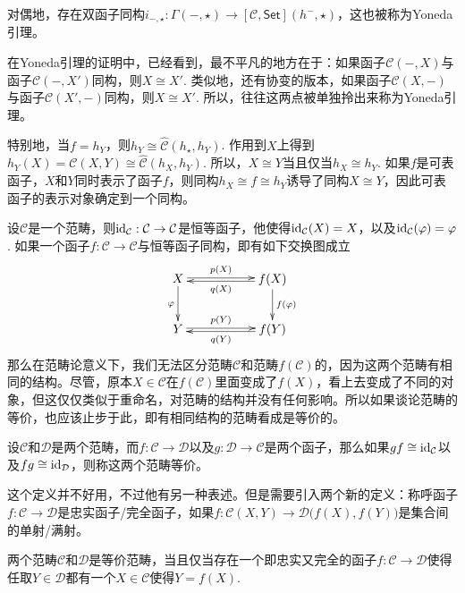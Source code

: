 \begin{pro}
对偶地，存在双函子同构$i_{-,\star}:\Gamma(-,\star)\to [\mathcal{C},\mathsf{Set}](h^-,\star)$，这也被称为Yoneda引理。
\end{pro}

在Yoneda引理的证明中，已经看到，最不平凡的地方在于：如果函子$\mathcal{C}(-,X)$与函子$\mathcal{C}(-,X')$同构，则$X\cong X'$. 类似地，还有协变的版本，如果函子$\mathcal{C}(X,-)$与函子$\mathcal{C}(X',-)$同构，则$X\cong X'$. 所以，往往这两点被单独拎出来称为Yoneda引理。

\para 特别地，当$f=h_Y$，则$h_Y\cong {\hat{\mathcal{C}}}(h_\star,h_Y)$. 作用到$X$上得到$h_Y(X)={\mathcal{C}}(X,Y)\cong {\hat{\mathcal{C}}}(h_X,h_Y)$. 所以，$X\cong Y$当且仅当$h_X\cong h_Y$. 如果$f$是可表函子，$X$和$Y$同时表示了函子$f$，则同构$h_X\cong f \cong h_Y$诱导了同构$X\cong Y$，因此可表函子的表示对象确定到一个同构。 

\para 设$\mathcal{C}$是一个范畴，则$\operatorname{id}_\mathcal{C}:\mathcal{C}\to \mathcal{C}$是恒等函子，他使得$\operatorname{id}_\mathcal{C}(X)=X$，以及$\operatorname{id}_\mathcal{C}(\varphi)=\varphi$. 如果一个函子$f:\mathcal{C}\to\mathcal{C}$与恒等函子同构，即有如下交换图成立
\[
\begin{xy}
	\xymatrix{
		X\ar@<0.3ex>[rr]^-{p(X)} \ar[d]_{\varphi}&&f(X) \ar[d]^{f(\varphi)}\ar@<0.3ex>[ll]^-{q(X)}\\
		Y\ar@<0.3ex>[rr]^-{p(Y)}&&f(Y)\ar@<0.3ex>[ll]^-{q(Y)}
	}
\end{xy}
\]
那么在范畴论意义下，我们无法区分范畴$\mathcal{C}$和范畴$f(\mathcal{C})$的，因为这两个范畴有相同的结构。尽管，原本$X\in \mathcal{C}$在$f(\mathcal{C})$里面变成了$f(X)$，看上去变成了不同的对象，但这仅仅类似于重命名，对范畴的结构并没有任何影响。所以如果谈论范畴的等价，也应该止步于此，即有相同结构的范畴看成是等价的。

设$\mathcal{C}$和$\mathcal{D}$是两个范畴，而$f:\mathcal{C}\to \mathcal{D}$以及$g:\mathcal{D}\to \mathcal{C}$是两个函子，那么如果$gf\cong \operatorname{id}_\mathcal{C}$以及$fg\cong \operatorname{id}_\mathcal{D}$，则称这两个范畴等价。

这个定义并不好用，不过他有另一种表述。但是需要引入两个新的定义：称呼函子$f:\mathcal{C}\to \mathcal{D}$是忠实函子/完全函子，如果$f:\mathcal{C}(X,Y)\to \mathcal{D}\bigl(f(X),f(Y)\bigr)$是集合间的单射/满射。

\begin{pro}\label{equivcat}
两个范畴$\mathcal{C}$和$\mathcal{D}$是等价范畴，当且仅当存在一个即忠实又完全的函子$f:\mathcal{C}\to \mathcal{D}$使得任取$Y\in\mathcal{D}$都有一个$X\in \mathcal{C}$使得$Y=f(X)$.\notprove
\end{pro}

